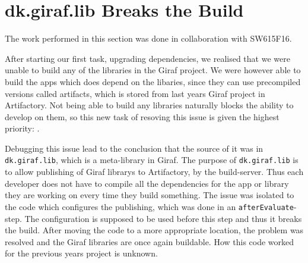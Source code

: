 \section{dk.giraf.lib Breaks the Build}\label{sec:breaking}
The work performed in this section was done in collaboration with SW615F16.

After starting our first task, upgrading dependencies, we realised that we were unable to build any of the libraries in the Giraf project. 
We were however able to build the apps which does depend on the libaries, since they can use precompiled versions called artifacts, which is stored from last years Giraf project in Artifactory. 
Not being able to build any libraries naturally blocks the ability to develop on them, so this new task of resoving this issue is given the highest priority: \pblocking. 

Debugging this issue lead to the conclusion that the source of it was in \texttt{dk.giraf.lib}, which is a meta-library in Giraf.
The purpose of \texttt{dk.giraf.lib} is to allow publishing of Giraf librarys to Artifactory, by the build-server.
Thus each developer does not have to compile all the dependencies for the app or library they are working on every time they build something. 
The issue was isolated to the code which configures the publishing, which was done in an \texttt{afterEvaluate}-step. 
The configuration is supposed to be used before this step and thus it breaks the build. 
After moving the code to a more appropriate location, the problem was resolved and the Giraf libraries are once again buildable.
How this code worked for the previous years project is unknown. 
